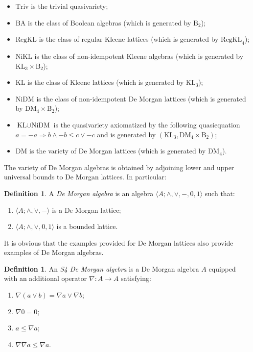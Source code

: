 \documentclass{amsart}
\theoremstyle{plain}
\theoremstyle{definition}
\newtheorem{definition}[theorem]{Definition}
\begin{document}
\begin{itemize}
    \item $\text{Triv}$ is the trivial quasivariety; 
    \item $\text{BA}$ is the class of Boolean algebras (which is generated by $\text{B}_2$); 
    \item $\text{RegKL}$ is the class of regular Kleene lattices (which is generated by $\text{RegKL}_4$); 
    \item $\text{NiKL}$ is the class of non-idempotent Kleene algebras (which is generated by $\text{KL}_3\times\text{B}_2$); 
    \item $\text{KL}$ is the class of Kleene lattices (which is generated by $\text{KL}_3$); 
    \item $\text{NiDM}$ is the class of non-idempotent De Morgan lattices (which is generated by $\text{DM}_4\times\text{B}_2$); 
    \item $\text{KL}\cup\text{NiDM}$ is the quasivariety axiomatized by the following quasiequation $a=-a\Rightarrow b\wedge-b\leq c\vee-c$ and is generated by $(\text{KL}_3, \text{DM}_4\times\text{B}_2)$; 
    \item $\text{DM}$ is the variety of De Morgan lattices (which is generated by $\text{DM}_4$). 
\end{itemize}





  


 The variety of De Morgan algebras is obtained by adjoining lower and upper universal bounds to De Morgan lattices. In particular: 

\begin{definition}
    A \emph{De Morgan algebra} is an algebra $\langle A;\wedge,\vee,-,0,1\rangle$ such that: 
    \begin{enumerate}
        \item $\langle A;\wedge,\vee,-\rangle$ is a De Morgan lattice; 
        \item $\langle A;\wedge,\vee,0,1\rangle$ is a bounded lattice. 
    \end{enumerate}
\end{definition}
It is obvious that the examples provided for De Morgan lattices also provide examples of De Morgan algebras. 
    

\begin{definition}
    An \emph{S4 De Morgan algebra} is a De Morgan algebra $A$ equipped with an additional operator $\nabla\colon A\to A$ satisfying: 
        \begin{enumerate}
            \item $\nabla(a\vee b)=\nabla a\vee\nabla b$; 
            \item $\nabla0=0$; 
            \item $a\leq\nabla a$; 
            \item $\nabla\nabla a\leq\nabla a$. 
        \end{enumerate}
\end{definition}
 
\end{document}
